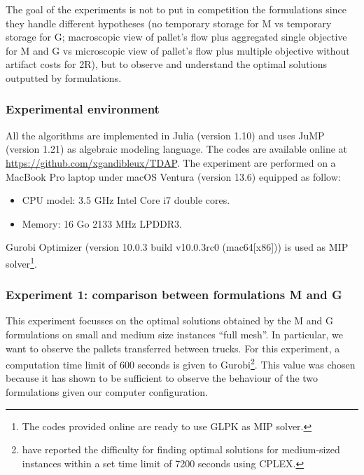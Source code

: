 \documentclass[preprint,12pt,authoryear]{elsarticle}
\begin{document}
\color{red}
The goal of the experiments is not to put in competition the formulations since they handle different hypotheses (no temporary storage for M vs temporary storage for G; macroscopic view of pallet's flow plus aggregated single objective for M and G vs microscopic view of pallet's flow plus multiple objective without artifact costs for 2R), but to observe and understand the optimal solutions outputted by formulations.
\color{black}

%
%
\subsubsection{Experimental environment}

All the algorithms are implemented in Julia (version 1.10) and uses JuMP (version 1.21) as algebraic modeling language.
The codes are available online at \url{https://github.com/xgandibleux/TDAP}.
The experiment are performed on a  MacBook Pro laptop under macOS Ventura (version 13.6) equipped as follow:
\begin{itemize}
    \item CPU model: 3.5 GHz Intel Core i7 double cores.
    \item Memory: 16 Go 2133 MHz LPDDR3.
\end{itemize}
Gurobi Optimizer (version 10.0.3 build v10.0.3rc0 (mac64[x86]))  is used as MIP solver\footnote{The codes provided online are ready to use GLPK as MIP solver.}.  


%
%
\subsubsection{Experiment 1: comparison between formulations M and G}\label{sec:resMG}

This experiment focusses on  the optimal solutions obtained by the M and G formulations on small and medium size instances
 ``full mesh''.
%
In particular, we want to observe the pallets transferred between trucks.
%
For this experiment, a computation time limit of 600 seconds is given to Gurobi\footnote{\citet{MIAO2009} have reported the difficulty for finding optimal solutions for medium-sized instances within a set time limit of 7200 seconds using CPLEX.}.
This value was chosen because it has shown to be sufficient to observe the behaviour of the two formulations given our computer configuration.
\end{document}
